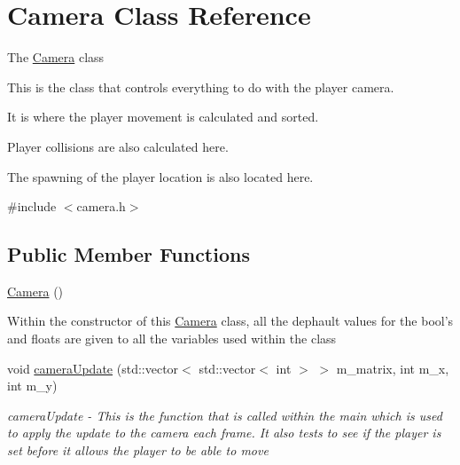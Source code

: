 \hypertarget{classCamera}{
\section{Camera Class Reference}
\label{classCamera}
}


The \hyperlink{classCamera}{Camera} class
\begin{DoxyItemize}
\item This is the class that controls everything to do with the player camera.
\item It is where the player movement is calculated and sorted.
\item Player collisions are also calculated here.
\item The spawning of the player location is also located here. 
\end{DoxyItemize} 


{\ttfamily \#include $<$camera.h$>$}\subsection*{Public Member Functions}
\begin{DoxyCompactItemize}
\item 
\hypertarget{classCamera_a01f94c3543f56ede7af49dc778f19331}{
\hyperlink{classCamera_a01f94c3543f56ede7af49dc778f19331}{Camera} ()}
\label{classCamera_a01f94c3543f56ede7af49dc778f19331}

\begin{DoxyCompactList}\small\item\em 
\begin{DoxyItemize}
\item Within the constructor of this \hyperlink{classCamera}{Camera} class, all the dephault values for the bool's and floats are given to all the variables used within the class 
\end{DoxyItemize}\item\end{DoxyCompactList}\item 
void \hyperlink{classCamera_a501b42a364d591925b732b88233fe5b5}{cameraUpdate} (std::vector$<$ std::vector$<$ int $>$ $>$ m\_\-matrix, int m\_\-x, int m\_\-y)
\begin{DoxyCompactList}\small\item\em cameraUpdate -\/ This is the function that is called within the main which is used to apply the update to the camera each frame. It also tests to see if the player is set before it allows the player to be able to move \item\end{DoxyCompactList}\end{DoxyCompactItemize}
